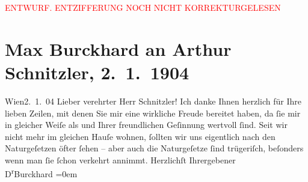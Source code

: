 
\begin{center}
            \textcolor{red}{ENTWURF. ENTZIFFERUNG NOCH NICHT KORREKTURGELESEN}
                      \end{center}
            
               \section[Max Burckhard an Arthur Schnitzler, 2. 1. 1904]{ Max Burckhard an Arthur Schnitzler, 2. 1. 1904}\nopagebreak{}\rehead{ }\begin{ledgroupsized}[t]{13cm}\normalsize\beginnumbering{} \toendnotes[C]{\smallbreak\pagebreak[2]} 
\toendnotes[C]{\smallbreak}\pstart
           \raggedleft{}{\pb}Wien2. 1. 04\pend
           \pstart{}Lieber verehrter Herr Schnitzler!\pend\pstart
           Ich danke Ihnen herzlich für Ihre lieben Zeilen, mit denen Sie mir eine wirkliche
                    Freude bereitet haben, da ſie mir in gleicher Weiſe als \label{K_L01355_1v}\label{K_L01355_1h} und Ihrer
                    freundlichen Geſinnung wertvoll ſind. Seit wir nicht mehr im gleichen Hauſe
                    wohnen, ſollten wir uns eigentlich nach den Naturgeſetzen öfter ſehen – aber {\pb}auch die Naturgeſetze ſind
                    trügeriſch, beſonders wenn man ſie ſchon verkehrt annimmt.\pend
           \pstart
           Herzlichſt Ihr\hspace*{1.5em}ergebener{\\[\baselineskip]}\spacefill\mbox{D\textsuperscript{r}Burckhard}\pend
           \leftskip=0em{}\endnumbering{}\end{ledgroupsized}  \newcommand{\dateiname}{L01355}\newcommand{\titel}{Max Burckhard an Arthur Schnitzler, 2. 1. 1904}\newcommand{\editorInnen}{Martin Anton Müller und Gerd-Hermann Susen}
      